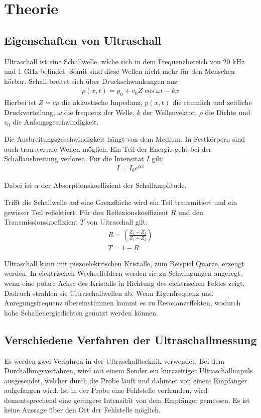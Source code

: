 \section{Theorie}
\label{sec:Theorie}

\subsection{Eigenschaften von Ultraschall}
Ultraschall ist eine Schallwelle, wlche sich in dem Frequenzbereich von 20 kHz und 1 GHz befindet. Somit sind diese
Wellen nicht mehr für den Menschen hörbar. Schall breitet sich über Druckschwankungen aus:
\begin{align}
  p(x,t) = p_0 + v_0 Z \cos{\omega t - k x}
\end{align}
Hierbei ist $Z= c \rho$ die akkustische Impedanz, $p(x, t)$ die räumlich und zeitliche Druckverteilung, $\omega$ die frequenz der Welle,
$k$ der Wellenvektor, $\rho$ die Dichte und $v_0$ die Anfangsgeschwindigkeit.

Die Ausbreitungsgeschwindigkeit hängt von dem Medium. In Festkörpern sind auch transversale Wellen möglich. Ein Teil der
Energie geht bei der Schallausbreitung verloren. Für die Intensität $I$ gilt:
\begin{align}
  I =I_0 e^{\alpha x}
\end{align}

Dabei ist $\alpha$ der Absorptionskoeffizient der Schallamplitude.

Trifft die Schallwelle auf eine Grenzfläche wird ein Teil transmitiert und ein gewisser Teil reflektiert.
Für den Reflexionskoeffizient $R$ und den Transmissionskoeffizient $T$ von Ultraschall gilt:
\begin{align}
  R = \left( \frac{Z_1 - Z_2}{Z_1 + Z_2} \right) \\
  T = 1 - R
\end{align}

Ultraschall kann mit piezoelektrischen Kristalle, zum Beispiel Quarze, erzeugt werden. In elektrischen Wechselfeldern werden
sie zu Schwingungen angeregt, wenn eine polare Achse des Kristalls in Richtung des elektrischen Feldes zeigt. Dadruch strahlen sie
Ultraschallwellen ab. Wenn Eigenfrequenz und Anregungsfrequenz übereinstimmen kommt es zu Resonanzeffekten, wodurch hohe Schallenergiedichten
genutzt werden können.


\subsection{Verschiedene Verfahren der Ultraschallmessung}
Es werden zwei Verfahren in der Ultraschalltechnik verwendet.
Bei dem Durchallungsverfahren, wird mit einem Sender ein kurzzeitiger Ultraschallimpuls ausgesendet, welcher
durch die Probe läuft und dahinter von einem Empfänger aufgefangen wird. Ist in der Probe eine Fehlstelle vorhanden, wird dementsprechend
eine geringere Intensität von dem Empfänger gemessen. Es ist keine Aussage über den Ort der Fehlstelle möglich.


